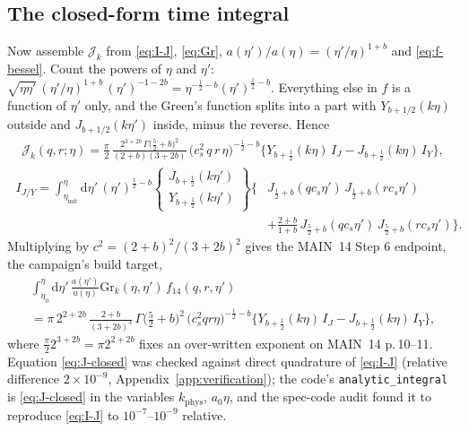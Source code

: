\documentclass[11pt,a4paper]{article}
\newcommand{\dd}{\mathrm{d}}
\newcommand{\Gr}{\mathrm{Gr}}
\newcommand{\etainit}{\eta_{\mathrm{init}}}
\newcommand{\kphys}{k_{\mathrm{phys}}}
\newcommand{\note}[1]{\textsf{#1}}
\theoremstyle{remark}
\begin{document}
\subsection{The closed-form time integral}
\label{sec:target}

Now assemble $\mathcal{J}_k$ from \eqref{eq:I-J}, \eqref{eq:Gr}, $a(\eta')/a(\eta) = (\eta'/\eta)^{1+b}$ and \eqref{eq:f-bessel}. Count the powers of $\eta$ and $\eta'$: $\sqrt{\eta\eta'}\,(\eta'/\eta)^{1+b}\,(\eta')^{-1-2b} = \eta^{-\frac12-b}(\eta')^{\frac12-b}$. Everything else in $f$ is a function of $\eta'$ only, and the Green's function splits into a part with $Y_{b+1/2}(k\eta)$ outside and $J_{b+1/2}(k\eta')$ inside, minus the reverse. Hence
\begin{equation}
\boxed{\;
\begin{aligned}
\mathcal{J}_k(q,r;\eta) = \frac{\pi}{2}\,\frac{2^{3+2b}\,\Gamma\!\big(\tfrac52+b\big)^2}{(2+b)(3+2b)}\,\big(c_s^2\,q\,r\,\eta\big)^{-\frac12-b}
\Big\{Y_{b+\frac12}(k\eta)\,I_J - J_{b+\frac12}(k\eta)\,I_Y\Big\},
\end{aligned}\;}
\label{eq:J-closed}
\end{equation}
\begin{equation}
\boxed{\;
\begin{aligned}
I_{J/Y} = \int_{\etainit}^{\eta}\dd\eta'\,(\eta')^{\frac12-b}
\begin{Bmatrix} J_{b+\frac12}(k\eta') \\[2pt] Y_{b+\frac12}(k\eta')\end{Bmatrix}
\Big\{&J_{\frac12+b}(qc_s\eta')\,J_{\frac12+b}(rc_s\eta')\\
&+ \frac{2+b}{1+b}\,J_{\frac52+b}(qc_s\eta')\,J_{\frac52+b}(rc_s\eta')\Big\}.
\end{aligned}\;}
\label{eq:IJIY}
\end{equation}
Multiplying by $c^2 = (2+b)^2/(3+2b)^2$ gives the \note{MAIN}~14 Step 6 endpoint, the campaign's build target,
\begin{multline}
\int_{\eta_0}^{\eta}\dd\eta'\,\frac{a(\eta')}{a(\eta)}\Gr_k(\eta,\eta')\,f_{14}(q,r,\eta')\\
= \pi\,2^{2+2b}\,\frac{2+b}{(3+2b)^3}\,\Gamma\!\big(\tfrac52+b\big)^2\,\big(c_s^2qr\eta\big)^{-\frac12-b}\Big\{Y_{b+\frac12}(k\eta)\,I_J - J_{b+\frac12}(k\eta)\,I_Y\Big\},
\label{eq:target}
\end{multline}
where $\tfrac{\pi}{2}2^{3+2b} = \pi2^{2+2b}$ fixes an over-written exponent on \note{MAIN}~14 p.\,10--11. Equation \eqref{eq:J-closed} was checked against direct quadrature of \eqref{eq:I-J} (relative difference $2\times10^{-9}$, Appendix~\ref{app:verification}); the code's \texttt{analytic\_integral} is \eqref{eq:J-closed} in the variables $\kphys$, $a_0\eta$, and the spec-code audit found it to reproduce \eqref{eq:I-J} to $10^{-7}$--$10^{-9}$ relative.
\end{document}
